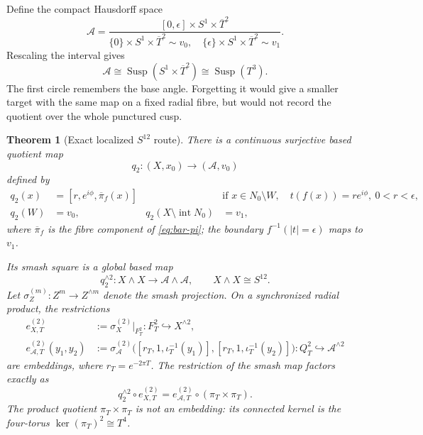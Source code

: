 \documentclass[11pt,letterpaper]{article}
\numberwithin{equation}{section}
\newtheorem{theorem}{Theorem}[section]
\theoremstyle{definition}
\theoremstyle{remark}
\newcommand{\Susp}{\operatorname{Susp}}
\begin{document}
Define the compact Hausdorff space
\begin{equation}
 \mathcal A=
 \frac{[0,\epsilon]\times S^1\times\overline T^2}
 {\{0\}\times S^1\times\overline T^2\sim v_0,
  \quad\{\epsilon\}\times S^1\times\overline T^2\sim v_1}.
 \label{eq:A-definition}
\end{equation}
Rescaling the interval gives
\begin{equation}
 \mathcal A\cong\Susp(S^1\times\overline T^2)\cong\Susp(T^3).
 \label{eq:A-suspension}
\end{equation}
The first circle remembers the base angle.  Forgetting it would give a
smaller target with the same map on a fixed radial fibre, but would not
record the quotient over the whole punctured cusp.

\begin{theorem}[Exact localized $S^{12}$ route]
\label{thm:S12-route}
There is a continuous surjective based quotient map
\begin{equation}
 q_2:(X,x_0)\longrightarrow(\mathcal A,v_0)
 \label{eq:q2}
\end{equation}
defined by
\begin{equation}
 \begin{aligned}
 q_2(x)&=[r,e^{i\phi},\overline\pi_f(x)]
 &&\text{if }x\in N_0\setminus W,
 \quad t(f(x))=re^{i\phi},\ 0<r<\epsilon,\\
 q_2(W)&=v_0,
 &q_2(X\setminus\operatorname{int}N_0)&=v_1,
 \end{aligned}
 \label{eq:q2-formula}
\end{equation}
where $\overline\pi_f$ is the fibre component of \cref{eq:bar-pi}; the
boundary $f^{-1}(|t|=\epsilon)$ maps to $v_1$.

Its smash square is a global based map
\begin{equation}
 q_2^{\wedge2}:X\wedge X\longrightarrow
 \mathcal A\wedge\mathcal A,
 \qquad X\wedge X\cong S^{12}.
 \label{eq:S12-map}
\end{equation}
Let \(\sigma_Z^{(m)}:Z^m\to Z^{\wedge m}\) denote the smash projection.
On a synchronized radial product, the restrictions
\begin{align*}
 e_{X,T}^{(2)}&:=\sigma_X^{(2)}|_{F_T^2}:F_T^2\hookrightarrow X^{\wedge2},\\
 e_{\mathcal A,T}^{(2)}(y_1,y_2)
 &:=\sigma_{\mathcal A}^{(2)}
 \bigl([r_T,1,\iota_T^{-1}(y_1)],
       [r_T,1,\iota_T^{-1}(y_2)]\bigr):
 Q_T^2\hookrightarrow\mathcal A^{\wedge2}
\end{align*}
are embeddings, where \(r_T=e^{-2\pi T}\).  The restriction of the smash
map factors exactly as
\begin{equation}
 q_2^{\wedge2}\circ e_{X,T}^{(2)}
 =e_{\mathcal A,T}^{(2)}\circ(\pi_T\times\pi_T).
 \label{eq:S12-fibre-map}
\end{equation}
The product quotient \(\pi_T\times\pi_T\) is not an embedding: its
connected kernel is the four-torus
\(\ker(\pi_T)^2\cong T^4\).


\end{theorem}
\end{document}
